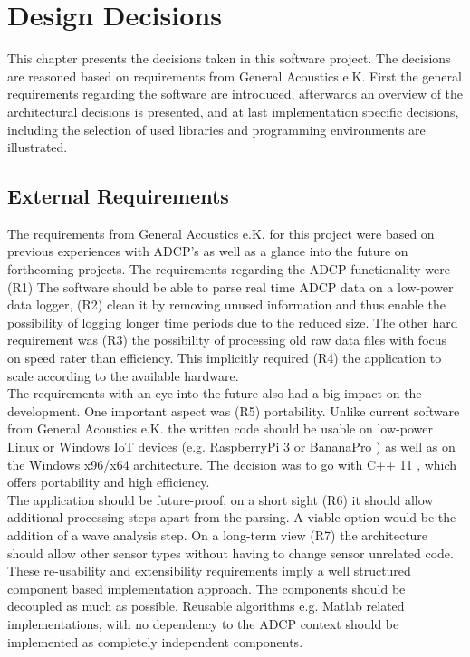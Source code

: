 
\chapter{Design Decisions}
This chapter presents the decisions taken in this software project. The decisions are reasoned based on requirements from General Acoustics e.K. First the general requirements regarding the software are introduced, afterwards an overview of the architectural decisions is presented, and at last implementation specific decisions, including the selection of used libraries and programming environments are illustrated. 
\section{External Requirements}
The requirements from General Acoustics e.K. for this project were based on previous experiences with ADCP's as well as a glance into the future on forthcoming projects. The requirements regarding the ADCP functionality were (R1) The software should be able to parse real time ADCP data on a low-power data logger, (R2) clean it by removing unused information and thus enable the possibility of logging longer time periods due to the reduced size. The other hard requirement was (R3) the possibility of processing old raw data files with focus on speed rater than efficiency. This implicitly required (R4) the application to scale according to the available hardware.\\ The requirements with an eye into the future also had a big impact on the development. One important aspect was (R5) portability. Unlike current software from General Acoustics e.K. the written code should be usable on low-power Linux or Windows IoT devices (e.g. RaspberryPi 3 \cite{raspberry} or BananaPro \cite{bananapro}) as well as on the Windows x96/x64 architecture. The decision was to go with C++ 11 \cite{cpp_11}, which offers portability and high efficiency.\\
The application should be future-proof, on a short sight (R6) it should allow additional processing steps apart from the parsing. A viable option would be the addition of a wave analysis step. On a long-term view (R7) the architecture should allow other sensor types without having to change sensor unrelated code.\\ 
These re-usability and extensibility requirements imply a well structured component based implementation approach. The components should be decoupled as much as possible. Reusable algorithms e.g. Matlab related implementations, with no dependency to the ADCP context should be implemented as completely independent components.\\
